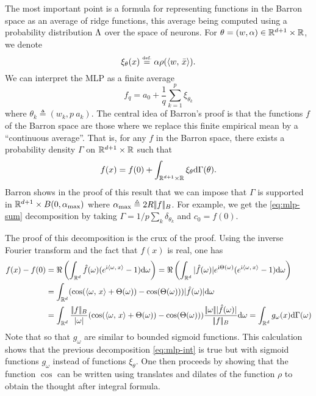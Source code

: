 The most important point is a formula for representing functions in the Barron space as an average of ridge functions, this average being computed using a probability distribution $\Lambda$ over the space of neurons. For $\theta = (w, \alpha) \in \mathbb{R}^{d+1} \times \mathbb{R} $, we denote
$$
    \xi_\theta(x) \stackrel{\mbox{\upshape\tiny def.}}{=} \alpha \rho( \langle w,\,\bar x\rangle).
$$
We can interpret the MLP as a finite average
\begin{equation}\label{eq:mlp-sum}
    f_q = a_0 + \frac{1}{q}\sum_{k=1}^p \xi_{\theta_k}
\end{equation}
where $\theta_k \triangleq (w_k, p \: a_k) $.
%
The central idea of Barron's proof is that the functions $ f $ of the Barron space are those where we replace this finite empirical mean by a ``continuous average''. That is, for any $f$ in the Barron space, there exists a probability density $\Gamma$ on $\mathbb{R}^{d+1} \times \mathbb{R}$ such that
\begin{equation}\label{eq:mlp-int}
    f(x) = f(0) + \int_{\mathbb{R}^{d+1} \times \mathbb{R}} \xi_\theta \mathrm{d}\Gamma(\theta).
\end{equation}
Barron shows in the proof of this result that we can impose that $\Gamma$ is supported in $\mathbb{R}^{d+1} \times B (0,\alpha_{\max})$ where $\alpha_{\max} \triangleq 2 R |\!| f |\!|_B$.
%
For example, we get the \eqref{eq:mlp-sum} decomposition by taking $\Gamma = 1/p \sum_k \delta_{\theta_k}$ and $c_0 = f(0)$.

The proof of this decomposition is the crux of the proof. Using the inverse Fourier transform and the fact that $ f(x) $ is real, one has 
\begin{align*}
	f(x) - f(0) &= \Re \left (\int_{\mathbb{R}^d}\hat{f}(\omega) (e^{\mathrm{i} \langle \omega,\,x\rangle}- 1) \mathrm{d}\omega \right) 
	= \Re \left (\int_{\mathbb{R}^d}| \hat{f}( \omega) | e^{\mathrm{i} \Theta (\omega)}(e^{\mathrm{i} \langle \omega,\,x\rangle}- 1) \mathrm{d}\omega \right) \\
	&= \int_{\mathbb{R}^d}(\cos ( \langle \omega,\,x\rangle + \Theta (\omega)) - \cos (\Theta (\omega))) | \hat{f}(\omega) | \mathrm{d}\omega  \\
	& = \int_{\mathbb{R}^d}\frac{|\!| f |\!|_B}{| \omega |}(\cos (\langle \omega,\,x\rangle + \Theta (\omega) ) - \cos (\Theta (\omega))) 
	\frac{|\!| \omega |\!| | \hat{f}(\omega) |}{|\!| f |\!|_B}\mathrm{d}\omega = \int_{\mathbb{R}^d}g_\omega(x) \mathrm{d}\Gamma (\omega) 
\end{align*}
%
Note that 
so that $g_\omega$ are similar to bounded sigmoid functions.
%
This calculation shows that the previous decomposition \eqref{eq:mlp-int} is true but with sigmoid functions $g_\omega$  instead of functions $\xi_\theta$. One then proceeds by showing that the function $\cos$ can be written using translates and dilates of the function $\rho$ to obtain the thought after integral formula.

